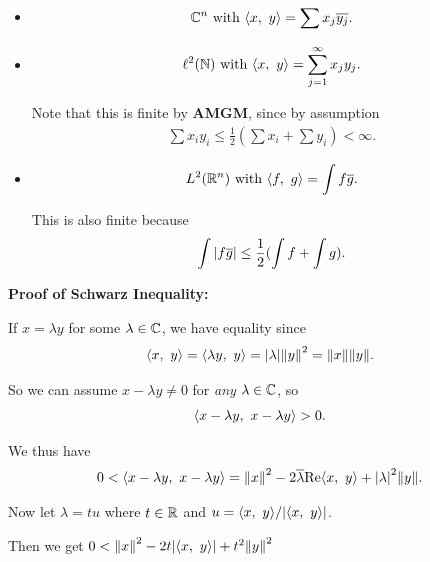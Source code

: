 \begin{itemize}
\item

  \begin{align*}
   {\mathbb{C}}^n \text{ with } {\left\langle {x},~{y} \right\rangle} = \sum x_j \overline{y_j}
   .\end{align*}
\item

  \begin{align*}
    \ell^2({\mathbb{N}}) \text{ with } {\left\langle {x},~{y} \right\rangle} = \sum_{j=1}^\infty x_j y_j
    .\end{align*}

  Note that this is finite by \textbf{AMGM}, since by assumption
  \begin{align*}
    \sum x_i y_i \leq \frac 1 2 (\sum x_i + \sum y_i) < \infty
    .\end{align*}
\item

  \begin{align*}
    L^2({\mathbb{R}}^n) \text{ with } {\left\langle {f},~{g} \right\rangle} = \int f \overline{g}
    .\end{align*}

  This is also finite because
  \begin{align*}
    \int {\left\lvert {f\overline g} \right\rvert} \leq \frac 1 2 (\int f + \int g)
    .\end{align*}
\end{itemize}

\textbf{Proof of Schwarz Inequality:}

If \(x= \lambda y\) for some \(\lambda \in {\mathbb{C}}\), we have equality since
\begin{align*}
{\left\langle {x},~{y} \right\rangle} = {\left\langle {\lambda y},~{y} \right\rangle} = {\left\lvert {\lambda} \right\rvert} {\left\lVert {y} \right\rVert}^2 = {\left\lVert {x} \right\rVert}{\left\lVert {y} \right\rVert}
.\end{align*}

So we can assume \(x-\lambda y \neq 0\) for \emph{any}
\(\lambda \in {\mathbb{C}}\), so
\begin{align*}
{\left\langle {x-\lambda y},~{x-\lambda y} \right\rangle} > 0
.\end{align*}

We thus have
\begin{align*}
0 < {\left\langle {x-\lambda y},~{x-\lambda y} \right\rangle} =
{\left\lVert {x} \right\rVert}^2 - 2\overline{\lambda} \mathrm{Re}{\left\langle {x},~{y} \right\rangle} + {\left\lvert {\lambda} \right\rvert}^2 {\left\lVert {y} \right\rVert}
.\end{align*}

Now let \(\lambda = tu\) where \(t\in {\mathbb{R}}\) and
\(u ={\left\langle {x},~{y} \right\rangle} / {\left\lvert {{\left\langle {x},~{y} \right\rangle}} \right\rvert}\).

Then we get \(0 < {\left\lVert {x} \right\rVert}^2 - 2t{\left\lvert {{\left\langle {x},~{y} \right\rangle}} \right\rvert} + t^2 {\left\lVert {y} \right\rVert}^2\)

